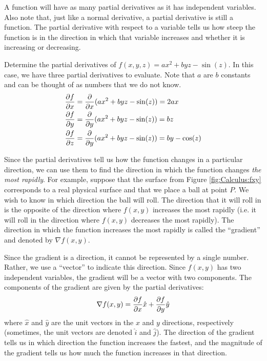 A function will have as many partial derivatives as it has independent variables. Also note that, just like a normal derivative, a partial derivative is still a function. The partial derivative with respect to a variable tells us how steep the function is in the direction in which that variable increases and whether it is increasing or decreasing.

\begin{example}{Determine the partial derivatives of $f(x,y,z)=ax^2+byz-\sin(z)$.}
In this case, we have three partial derivatives to evaluate. Note that $a$ are $b$ constants and can be thought of as numbers that we do not know.
\label{ex:Calculus:partials}
\begin{align*}
\frac{\partial f}{\partial x}&=\frac{\partial }{\partial x}(ax^2+byz-\sin(z)) = 2ax\\
\frac{\partial f}{\partial y}&=\frac{\partial }{\partial y}(ax^2+byz-\sin(z)) = bz \\
\frac{\partial f}{\partial z}&=\frac{\partial }{\partial y}(ax^2+byz-\sin(z)) = by-\cos(z) 
\end{align*} 
\end{example}

Since the partial derivatives tell us how the function changes in a particular direction, we can use them to find the direction in which the function changes \textit{the most rapidly}. For example, suppose that the surface from Figure \ref{fig:Calculus:fxy} corresponds to a real physical surface and that we place a ball at point $P$. We wish to know in which direction the ball will roll. The direction that it will roll in is the opposite of the direction where $f(x,y)$ increases the most rapidly (i.e. it will roll in the direction where $f(x,y)$ decreases the most rapidly). The direction in which the function increases the most rapidly is called the ``gradient'' and denoted by $\nabla f(x,y)$.

Since the gradient is a direction, it cannot be represented by a single number. Rather, we use a ``vector'' to indicate this direction. Since $f(x,y)$ has two independent variables, the gradient will be a vector with two components. The components of the gradient are given by the partial derivatives:
\begin{align*}
\nabla f(x,y) = \frac{\partial f}{\partial x}\hat x+\frac{\partial f}{\partial y} \hat y
\end{align*}
where $\hat x$ and $\hat y$ are the unit vectors in the $x$ and $y$ directions, respectively (sometimes, the unit vectors are denoted $\hat i$ and $\hat j$). The direction of the gradient tells us in which direction the function increases the fastest, and the magnitude of the gradient tells us how much the function increases in that direction.

